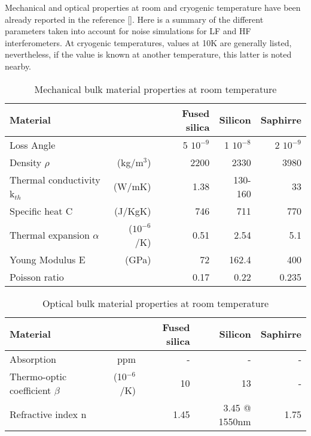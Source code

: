 
Mechanical and optical properties at room and cryogenic temperature have been already reported in the reference [\cite{Franc2009}]. Here is a summary of the different parameters taken into account for noise simulations for LF and HF interferometers. 
At cryogenic temperatures, values at 10K are generally listed, nevertheless, if the value is known at another temperature, this latter is noted nearby. 

\begin{table}
\begin{center}
\begin{tabular}{|l r||r|r|r|}
  \hline
    {\large\strut} Material  & & Fused silica & Silicon & Saphirre \\
  \hline
  \hline
   {\large\strut} Loss Angle & & 5 $10^{-9}$ & 1 $10^{-8}$  & 2 $10^{-9}$ \\
   {\large\strut} Density $\rho$ & (kg/m$^3$) & 2200 & 2330 & 3980\\
   {\large\strut} Thermal conductivity k$_{th}$ & (W/mK) & 1.38  & 130-160  & 33 \\
   {\large\strut} Specific heat C & (J/KgK) & 746  & 711  & 770\\
   {\large\strut} Thermal expansion $\alpha$ & ($10^{-6}$/K) &  0.51  & 2.54 & 5.1\\
   {\large\strut} Young Modulus E & (GPa) &  72 & 162.4 & 400\\
   {\large\strut} Poisson ratio & & 0.17 & 0.22 & 0.235\\
  \hline
\end{tabular}
\end{center}
\caption{Mechanical bulk material properties at room temperature}
\label{tab:Mech_Bulk_Param}
\end{table}

\begin{table}
\begin{center}
\begin{tabular}{|l r||r|r|r|}
  \hline
    {\large\strut} Material  & & Fused silica & Silicon & Saphirre \\
  \hline
  \hline
  {\large\strut} Absorption & ppm & - & - & - \\
  {\large\strut} Thermo-optic coefficient $\beta$ & (10$^{-6}$/K) & 10 & 13 & - \\
  {\large\strut} Refractive index n & & 1.45 & 3.45 @ 1550nm & 1.75\\
 \hline
\end{tabular}
\end{center}
\caption{Optical bulk material properties at room temperature}
\label{tab:Optics_Bulk_Param}
\end{table}

